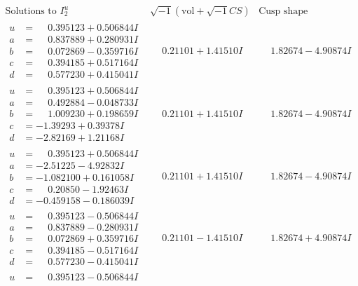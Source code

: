 \documentclass[1p]{elsarticle_modified}
\theoremstyle{definition}
\newcommand{\I}{\sqrt{-1}}
\begin{document}
$$\begin{array}{c|c|c}  
\text{Solutions to }I^u_{2}& \I (\text{vol} + \sqrt{-1}CS) & \text{Cusp shape}\\
 \hline 
\begin{aligned}
u &= \phantom{-}0.395123 + 0.506844 I \\
a &= \phantom{-}0.837889 + 0.280931 I \\
b &= \phantom{-}0.072869 - 0.359716 I \\
c &= \phantom{-}0.394185 + 0.517164 I \\
d &= \phantom{-}0.577230 + 0.415041 I\end{aligned}
 & \phantom{-}0.21101 + 1.41510 I & \phantom{-}1.82674 - 4.90874 I \\ \hline\begin{aligned}
u &= \phantom{-}0.395123 + 0.506844 I \\
a &= \phantom{-}0.492884 - 0.048733 I \\
b &= \phantom{-}1.009230 + 0.198659 I \\
c &= -1.39293 + 0.39378 I \\
d &= -2.82169 + 1.21168 I\end{aligned}
 & \phantom{-}0.21101 + 1.41510 I & \phantom{-}1.82674 - 4.90874 I \\ \hline\begin{aligned}
u &= \phantom{-}0.395123 + 0.506844 I \\
a &= -2.51225 - 4.92832 I \\
b &= -1.082100 + 0.161058 I \\
c &= \phantom{-}0.20850 - 1.92463 I \\
d &= -0.459158 - 0.186039 I\end{aligned}
 & \phantom{-}0.21101 + 1.41510 I & \phantom{-}1.82674 - 4.90874 I \\ \hline\begin{aligned}
u &= \phantom{-}0.395123 - 0.506844 I \\
a &= \phantom{-}0.837889 - 0.280931 I \\
b &= \phantom{-}0.072869 + 0.359716 I \\
c &= \phantom{-}0.394185 - 0.517164 I \\
d &= \phantom{-}0.577230 - 0.415041 I\end{aligned}
 & \phantom{-}0.21101 - 1.41510 I & \phantom{-}1.82674 + 4.90874 I \\ \hline\begin{aligned}
u &= \phantom{-}0.395123 - 0.506844 I \\

\end{aligned}
\end{array}$$
\end{document}
